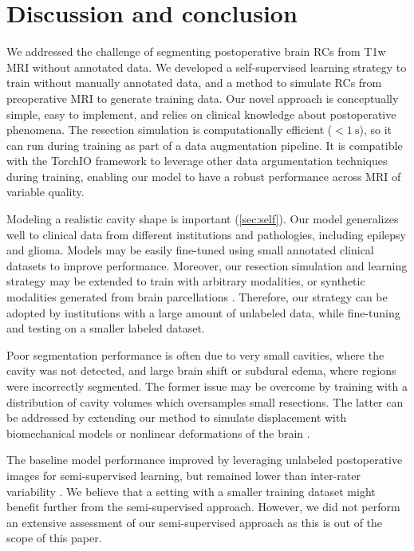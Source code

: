 \section{Discussion and conclusion}
\label{sec:discussion}

We addressed the challenge of segmenting postoperative brain \acp{RC} from \ac{T1w} \ac{MRI} without annotated data.
We developed a self-supervised learning strategy to train without manually annotated data, and a method to simulate \acp{RC} from preoperative \ac{MRI} to generate training data.
Our novel approach is conceptually simple, easy to implement, and relies on clinical knowledge about postoperative phenomena.
The resection simulation is computationally efficient ($< \SI{1}{\second}$), so it can run during training as part of a data augmentation pipeline.
It is compatible with the TorchIO framework \cite{perez-garcia_torchio_2021} to leverage other data argumentation techniques during training, enabling our model to have a robust performance across \ac{MRI} of variable quality.

Modeling a realistic cavity shape is important (\cref{sec:self}).
Our model generalizes well to clinical data from different institutions and pathologies, including epilepsy and glioma.
Models may be easily fine-tuned using small annotated clinical datasets to improve performance.
Moreover, our resection simulation and learning strategy may be extended to train with arbitrary modalities, or synthetic modalities generated from brain parcellations \cite{billot_learning_2020}.
Therefore, our strategy can be adopted by institutions with a large amount of unlabeled data, while fine-tuning and testing on a smaller labeled dataset.

Poor segmentation performance is often due to very small cavities, where the cavity was not detected, and large brain shift or subdural edema, where regions were incorrectly segmented.
The former issue may be overcome by training with a distribution of cavity volumes which oversamples small resections.
The latter can be addressed by extending our method to simulate displacement with biomechanical models or nonlinear deformations of the brain \cite{granados_generative_2021}.

The baseline model performance improved by leveraging unlabeled postoperative images for semi-supervised learning, but remained lower than inter-rater variability \cite{perez-garcia_simulation_2020}.  %
We believe that a setting with a smaller training dataset might benefit further from the semi-supervised approach.
However, we did not perform an extensive assessment of our semi-supervised approach as this is out of the scope of this paper.

